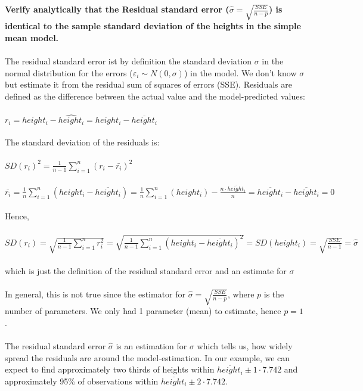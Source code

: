 \documentclass[a4paper,12pt]{article}
\begin{document}
\noindent \textbf{Verify analytically that the Residual standard error ($\hat{\sigma}=\sqrt{\frac{SSE}{n-p}}$) is identical to the sample standard deviation of the heights in the simple mean model.}
\\
\\
The residual standard error ist by definition the standard deviation $\sigma$ in the normal distribution for the errors ($\varepsilon_i \sim N(0,\sigma)$) in the model. 
We don't know $\sigma$ but estimate it from the residual sum of squares of errors (SSE).
Residuals are defined as the difference between the actual value and the model-predicted values:
\\
\\
$r_i = height_i - \widehat{height_i} = height_i - \overline{height_i}$
\\
\\
The standard deviation of the residuals is:
\\
\\
$ SD(r_i)^2 = \frac{1}{n-1} \sum_{i=1}^n (r_i - \bar{r_i})^2$
\\
\\
$\overline{r_i} = \frac{1}{n} \sum_{i=1}^n (height_i - \overline{height_i}) = \frac{1}{n} \sum_{i=1}^n (height_i) - \frac{n \cdot \overline{height_i}}{n} = \overline{height_i} - \overline{height_i} = 0$
\\
\\
Hence,\\
\\
$SD(r_i) = \sqrt{\frac{1}{n-1} \sum_{i=1}^n r_i^2} = \sqrt{\frac{1}{n-1} \sum_{i=1}^n (height_i - \overline{height_i})^2} = SD(height_i) = \sqrt{\frac{SSE}{n-1}} = \hat{\sigma}$
\\
\\
which is just the definition of the residual standard error and an estimate for $\sigma$
\\
\\
In general, this is not true since the estimator for $\hat{\sigma} = \sqrt{\frac{SSE}{n-p}}$, where $p$ is the number of parameters.
We only had 1 parameter (mean) to estimate, hence $p=1$.
\\
\\
The residual standard error $\hat{\sigma}$ is an estimation for $\sigma$ which tells us, how widely spread the residuals are around the model-estimation.
In our example, we can expect to find approximately two thirds of heights within $\overline{height_i} \pm 1 \cdot 7.742$ and approximately 95\%
of observations within $\overline{height_i} \pm 2 \cdot 7.742$.
\end{document}

